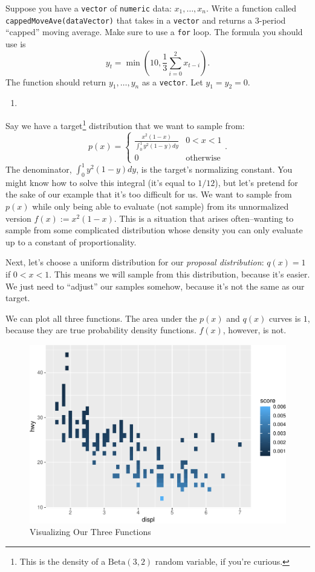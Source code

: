 \documentclass[
  12pt,
  krantz2]{krantz}
\providecommand{\tightlist}{%
  \setlength{\itemsep}{0pt}\setlength{\parskip}{0pt}}
\begin{document}
Suppose you have a \texttt{vector} of \texttt{numeric} data: \(x_1, \ldots, x_n\). Write a function called \texttt{cappedMoveAve(dataVector)} that takes in a \texttt{vector} and returns a 3-period ``capped'' moving average. Make sure to use a \texttt{for} loop. The formula you should use is
\[
y_t = \min\left(10, \frac{1}{3}\sum_{i=0}^2x_{t-i} \right).
\]
The function should return \(y_1, \ldots, y_n\) as a \texttt{vector}. Let \(y_1 = y_2 = 0\).

\begin{enumerate}
\def\labelenumi{\arabic{enumi}.}
\setcounter{enumi}{1}
\tightlist
\item
\end{enumerate}

Say we have a target\footnote{This is the density of a \(\text{Beta}(3,2)\) random variable, if you're curious.} distribution that we want to sample from:
\[
p(x) = 
\begin{cases}
\frac{x^2(1-x)}{\int_0^1 y^2(1-y) dy} & 0 < x < 1 \\
0 & \text{otherwise}
\end{cases}.
\]
The denominator, \(\int_0^1 y^2(1-y) dy\), is the target's normalizing constant. You might know how to solve this integral (it's equal to \(1/12\)), but let's pretend for the sake of our example that it's too difficult for us. We want to sample from \(p(x)\) while only being able to evaluate (not sample) from its unnormalized version \(f(x) := x^2(1-x)\). This is a situation that arises often--wanting to sample from some complicated distribution whose density you can only evaluate up to a constant of proportionality.

Next, let's choose a uniform distribution for our \emph{proposal distribution}: \(q(x) = 1\) if \(0 < x < 1\). This means we will sample from this distribution, because it's easier. We just need to ``adjust'' our samples somehow, because it's not the same as our target.

We can plot all three functions. The area under the \(p(x)\) and \(q(x)\) curves is \(1\), because they are true probability density functions. \(f(x)\), however, is not.

\begin{figure}

{\centering \includegraphics[width=0.4\linewidth]{r_and_python_book_files/figure-latex/unnamed-chunk-188-1} 

}

\caption{Visualizing Our Three Functions}\label{fig:unnamed-chunk-188}
\end{figure}
\end{document}
